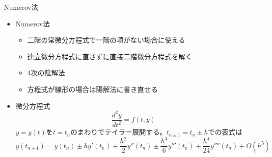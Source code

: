 \begin{frame}[t,fragile]{Numerov法}
  \begin{itemize}
  \item Numerov法
    \begin{itemize}
    \item 二階の常微分方程式で一階の項がない場合に使える
    \item 連立微分方程式に直さずに直接二階微分方程式を解く
    \item 4次の陰解法
    \item 方程式が線形の場合は陽解法に書き直せる
    \end{itemize}
  \item 微分方程式
    \[
    \frac{d^2y}{dt^2} = f(t,y)
    \]
  $y=y(t)$を$t=t_n$のまわりでテイラー展開する。$t_{n \pm 1} = t_n \pm h$での表式は
      \[
      y(t_{n \pm 1}) = y(t_n) \pm h y'(t_n) + \frac{h^2}{2} y''(t_n) \pm \frac{h^3}{6} y'''(t_n) + \frac{h^4}{24} y''''(t_n)  + O(h^5)
      \]
  \end{itemize}
\end{frame}
